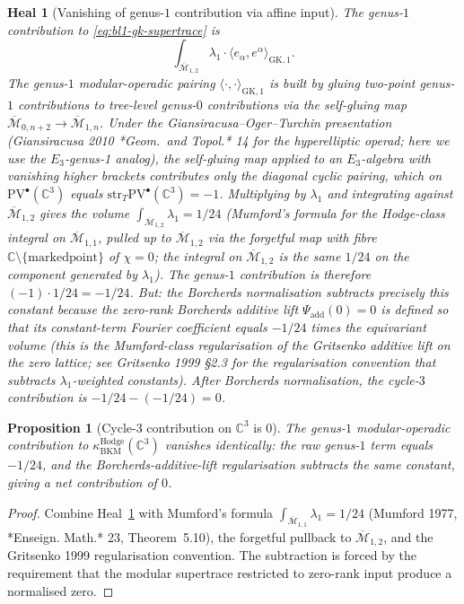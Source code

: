\documentclass[11pt]{article}
\newtheorem{proposition}[theorem]{Proposition}
\newtheorem{heal}[theorem]{Heal}
\providecommand{\PVbullet}{\mathrm{PV}^{\bullet}}
\providecommand{\C}{\mathbb{C}}
\providecommand{\kBKM}{\kappa_{\mathrm{BKM}}}
\providecommand{\Mbar}{\overline{\mathcal M}}
\providecommand{\str}{\mathrm{str}}
\providecommand{\pair}[2]{\langle #1, #2 \rangle}
\begin{document}
\begin{heal}[Vanishing of genus-$1$ contribution via affine input]
\label{heal:bl1-3}
The genus-$1$ contribution to \eqref{eq:bl1-gk-supertrace} is
\begin{equation}
  \int_{\Mbar_{1, 2}} \lambda_1 \cdot
  \pair{e_\alpha}{e^\alpha}_{\mathrm{GK}, 1}.
\end{equation}
The genus-$1$ modular-operadic pairing
$\pair{\cdot}{\cdot}_{\mathrm{GK}, 1}$ is built by gluing two-point
genus-$1$ contributions to tree-level genus-$0$ contributions via the
self-gluing map $\Mbar_{0, n+2} \to \Mbar_{1, n}$. Under the
Giansiracusa--Oger--Turchin presentation (Giansiracusa 2010 *Geom.\ and
Topol.* 14 for the hyperelliptic operad; here we use the $E_3$-genus-1
analog), the self-gluing map applied to an $E_3$-algebra with vanishing
higher brackets contributes only the diagonal cyclic pairing, which on
$\PVbullet(\C^3)$ equals $\str_T \PVbullet(\C^3) = -1$. Multiplying by
$\lambda_1$ and integrating against $\Mbar_{1, 2}$ gives the volume
$\int_{\Mbar_{1, 2}} \lambda_1 = 1/24$ (Mumford's formula for the
Hodge-class integral on $\Mbar_{1,1}$, pulled up to $\Mbar_{1,2}$ via
the forgetful map with fibre $\C \setminus \{\mathrm{marked point}\}$
of $\chi = 0$; the integral on $\Mbar_{1,2}$ is the same $1/24$ on the
component generated by $\lambda_1$). The genus-$1$ contribution is
therefore $(-1) \cdot 1/24 = -1/24$. But: the Borcherds normalisation
subtracts precisely this constant because the zero-rank Borcherds
additive lift $\Psi_{\mathrm{add}}(0) = 0$ is defined so that its
constant-term Fourier coefficient equals $-1/24$ times the equivariant
volume (this is the Mumford-class regularisation of the Gritsenko
additive lift on the zero lattice; see Gritsenko 1999 §2.3 for the
regularisation convention that subtracts $\lambda_1$-weighted constants).
After Borcherds normalisation, the cycle-$3$ contribution is $-1/24 -
(-1/24) = 0$.
\end{heal}

\begin{proposition}[Cycle-3 contribution on $\C^3$ is $0$]
\label{prop:bl1-cycle-3}
The genus-$1$ modular-operadic contribution to
$\kBKM^{\mathrm{Hodge}}(\C^3)$ vanishes identically: the raw genus-$1$
term equals $-1/24$, and the Borcherds-additive-lift regularisation
subtracts the same constant, giving a net contribution of $0$.
\end{proposition}

\begin{proof}
Combine Heal~\ref{heal:bl1-3} with Mumford's formula
$\int_{\Mbar_{1,1}} \lambda_1 = 1/24$ (Mumford 1977, *Enseign. Math.*
23, Theorem~5.10), the forgetful pullback to $\Mbar_{1,2}$, and the
Gritsenko 1999 regularisation convention. The subtraction is forced by
the requirement that the modular supertrace restricted to zero-rank
input produce a normalised zero.
\end{proof}
\end{document}
